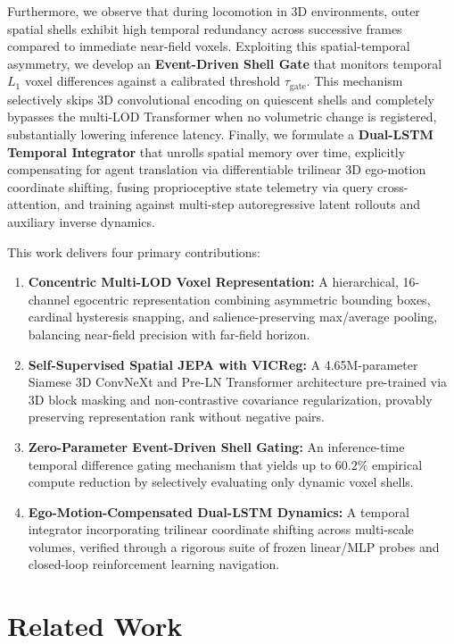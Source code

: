 \documentclass{svproc}
\begin{document}
Furthermore, we observe that during locomotion in 3D environments, outer spatial shells exhibit high temporal redundancy across successive frames compared to immediate near-field voxels. Exploiting this spatial-temporal asymmetry, we develop an \textbf{Event-Driven Shell Gate} that monitors temporal $L_1$ voxel differences against a calibrated threshold $\tau_{\text{gate}}$. This mechanism selectively skips 3D convolutional encoding on quiescent shells and completely bypasses the multi-LOD Transformer when no volumetric change is registered, substantially lowering inference latency. Finally, we formulate a \textbf{Dual-LSTM Temporal Integrator} that unrolls spatial memory over time, explicitly compensating for agent translation via differentiable trilinear 3D ego-motion coordinate shifting, fusing proprioceptive state telemetry via query cross-attention, and training against multi-step autoregressive latent rollouts and auxiliary inverse dynamics.

This work delivers four primary contributions:
\begin{enumerate}
    \item \textbf{Concentric Multi-LOD Voxel Representation:} A hierarchical, 16-channel egocentric representation combining asymmetric bounding boxes, cardinal hysteresis snapping, and salience-preserving max/average pooling, balancing near-field precision with far-field horizon.
    \item \textbf{Self-Supervised Spatial JEPA with VICReg:} A 4.65M-parameter Siamese 3D ConvNeXt and Pre-LN Transformer architecture pre-trained via 3D block masking and non-contrastive covariance regularization, provably preserving representation rank without negative pairs.
    \item \textbf{Zero-Parameter Event-Driven Shell Gating:} An inference-time temporal difference gating mechanism that yields up to $60.2\%$ empirical compute reduction by selectively evaluating only dynamic voxel shells.
    \item \textbf{Ego-Motion-Compensated Dual-LSTM Dynamics:} A temporal integrator incorporating trilinear coordinate shifting across multi-scale volumes, verified through a rigorous suite of frozen linear/MLP probes and closed-loop reinforcement learning navigation.
\end{enumerate}

\section{Related Work}
\end{document}
